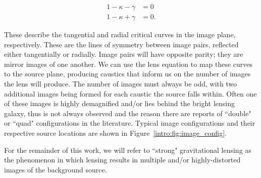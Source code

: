 \begin{align}
1-\kappa-\gamma &= 0 \\
1-\kappa+\gamma &= 0.
\end{align}

\noindent These describe the tangential and radial critical curves in the image plane, respectively. These are the lines of symmetry between image pairs, reflected either tangentially or radially. Image pairs will have opposite parity; they are mirror images of one another. We can use the lens equation to map these curves to the source plane, producing caustics that inform us on the number of images the lens will produce. The number of images must always be odd, with two additional images being formed for each caustic the source falls within. Often one of these images is highly demagnified and/or lies behind the bright lensing galaxy, thus is not always observed and the reason there are reports of ``double" or ``quad" configurations in the literature. Typical image configurations and their respective source locations are shown in Figure~\ref{intro:fig:image_config}.

For the remainder of this work, we will refer to ``strong" gravitational lensing as the phenomenon in which lensing results in multiple and/or highly-distorted images of the background source.

